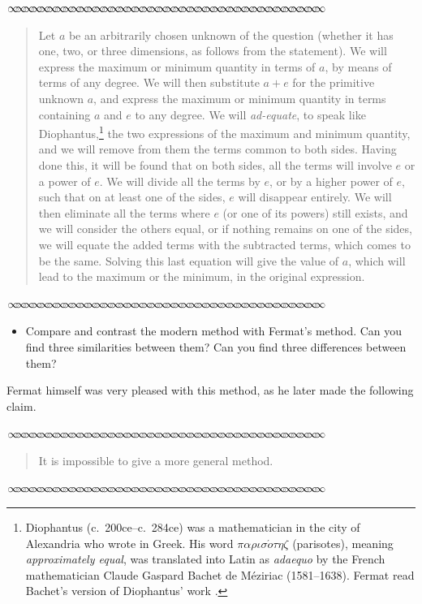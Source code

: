 \documentclass[11pt]{article}
\newcommand{\sep}{\vspace{-3pt}
\begin{center}
{\mathversion{normal}
$\infty \mspace{-5.5mu}\infty \mspace{-5.5mu}\infty \mspace{-5.5mu}\infty \mspace{-5.5mu}
\infty \mspace{-5.5mu}\infty \mspace{-5.5mu}\infty \mspace{-5.5mu}\infty \mspace{-5.5mu}
\infty \mspace{-5.5mu}\infty \mspace{-5.5mu}\infty \mspace{-5.5mu}\infty \mspace{-5.5mu}
\infty \mspace{-5.5mu}\infty \mspace{-5.5mu}\infty \mspace{-5.5mu}\infty \mspace{-5.5mu}
\infty \mspace{-5.5mu}\infty \mspace{-5.5mu}\infty \mspace{-5.5mu}\infty \mspace{-5.5mu}
\infty \mspace{-5.5mu}\infty \mspace{-5.5mu}\infty \mspace{-5.5mu}\infty \mspace{-5.5mu}
\infty \mspace{-5.5mu}\infty \mspace{-5.5mu}\infty \mspace{-5.5mu}\infty \mspace{-5.5mu}
\infty \mspace{-5.5mu}\infty \mspace{-5.5mu}\infty \mspace{-5.5mu}\infty \mspace{-5.5mu}
\infty \mspace{-5.5mu}\infty \mspace{-5.5mu}\infty \mspace{-5.5mu}\infty \mspace{-5.5mu}
\infty \mspace{-5.5mu}\infty \mspace{-5.5mu}\infty \mspace{-5.5mu}\infty \mspace{-5.5mu}$}
\end{center} \vspace*{-5pt}}
\newenvironment{source}%
 {\bigskip \sep \vspace*{-6pt} \begin{quote}
          \begin{sf}   }
   {   \end{sf}     \end{quote} \vspace*{-6pt} \sep \bigskip}%
\newcounter{tasknumb}
\newcommand{\tasknumb}[1]{\refstepcounter{tasknumb}\textmd{\textbf{$\fbox{$\fbox{Task \thetasknumb}$}$}}#1}
\newenvironment{task}[1][]%
 {\begin{itemize}
 \item[\tasknumb{#1}]  }
{
    \end{itemize}    }%
\begin{document}
\begin{source}

Let $a$ be an arbitrarily chosen unknown of the question (whether it has one, two, or three dimensions, as follows from the statement).  We will express the maximum or minimum quantity in terms of $a$, by means of terms of any degree.  We will then substitute $a+e$ for the primitive unknown $a$, and express the maximum or minimum quantity in terms containing $a$ and $e$ to any degree.  We will \emph{ad-equate}, to speak like Diophantus,\footnote{Diophantus (c.~200{\sc ce}--c.~284{\sc ce}) was a mathematician in the city of Alexandria who wrote in Greek.  His word $\pi\alpha\rho\iota\sigma\acute{o}\tau\eta\zeta$ (parisotes), meaning \emph{approximately equal}, was translated into Latin as \emph{adaequo} by the French mathematician Claude Gaspard Bachet de M\'{e}ziriac (1581--1638).  Fermat read Bachet's version of Diophantus' work \citep{KatzAndFriends}.} the two expressions of the maximum and minimum quantity, and we will remove from them the terms common to both sides.  Having done this, it will be found that on both sides, all the terms will involve $e$ or a power of $e$.  We will divide all the terms by $e$, or by a higher power of $e$, such that on at least one of the sides, $e$ will disappear entirely.  We will then eliminate all the terms where $e$ (or one of its powers) still exists, and we will consider the others equal, or if nothing remains on one of the sides, we will equate the added terms with the subtracted terms, which comes to be the same.  Solving this last equation will give the value of $a$, which will lead to the maximum or the minimum, in the original expression.

\end{source}

\begin{task}
 Compare and contrast the modern method with Fermat's method.  Can you find three similarities between them?  Can you find three differences between them?
 \end{task}

Fermat himself was very pleased with this method, as he later made the following claim. 

\begin{source} It is impossible to give a more general method.
\end{source}
\end{document}
